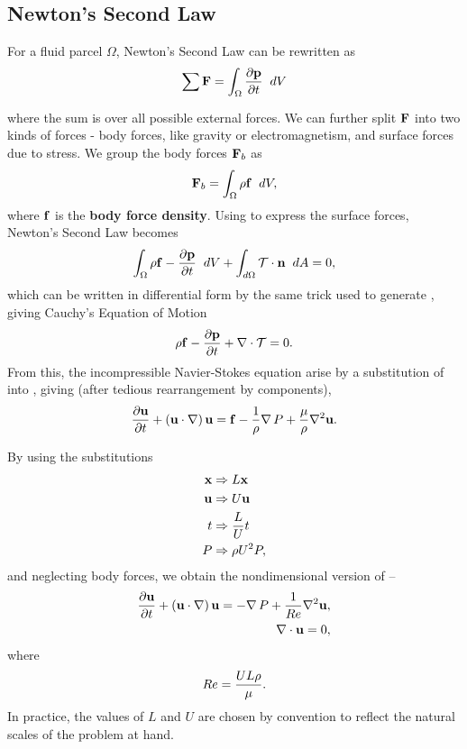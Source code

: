 \subsection{Newton's Second Law}
For a fluid parcel $\Omega$, Newton's Second Law can be rewritten as
\begin{equation}
\sum{}{}{\Vector{F}} = \int{\Omega}{}{
							\pder{1}{\Vector{p}}{t}}{dV}
\end{equation}
where the sum is over all possible external forces. We can further split $\mathbf{F}$ into two kinds of forces - body forces, like gravity or electromagnetism, and surface forces due to stress. We group the body forces $\mathbf{F}_b$ as \begin{equation}
\Vector{F}_b = \int{\Omega}{}{\rho\Vector{f}}{dV},
\end{equation}
where $\mathbf{f}$ is the {\bf body force density}. Using  to express the surface forces, Newton's Second Law becomes
\begin{equation}
\int{\Omega}{}{\rho{\Vector{f}-\pder{1}{\Vector{p}}{t}}}{dV} + \int{d\Omega}{}{\Tensor{T}\cdot\Vector{n}}{dA} = 0,
\end{equation}
which can be written in differential form by the same trick used to generate , giving Cauchy's Equation of Motion
\begin{equation}\label{eq:CauchyEOM}
\rho{\Vector{f}-\pder{1}{\Vector{p}}{t} } + \Div{\Tensor{T}} = 0.
\end{equation}
From this, the incompressible Navier-Stokes equation arise by a substitution of  into , giving (after tedious rearrangement by components),
\begin{equation}\label{eq:NS}
\pder{1}{\Vector{u}}{t} + \paren{\Vector{u}\cdot\nabla}\Vector{u} = \Vector{f} - \frac{1}{\rho}\Grad{P} + \frac{\mu}{\rho}\nabla^2\Vector{u}.
\end{equation}

By using the substitutions
\begin{align}
\mathbf{x} &\Rightarrow L\mathbf{x}\\
\mathbf{u} &\Rightarrow U\mathbf{u}\\
t &\Rightarrow \dfrac{L}{U}t\\
P &\Rightarrow \rho U^2P,
\end{align}
and neglecting body forces, we obtain the nondimensional version of  --
\begin{align}
\pder{1}{\Vector{u}}{t} + \paren{\Vector{u}\cdot\nabla}\Vector{u} = -\Grad{P} + \frac{1}{\ReN}\nabla^2\Vector{u}\label{eq:NSND},\\
\nabla\cdot \Vector{u} = 0,
\end{align}
where \begin{equation}\label{eq:ReN}Re= \dfrac{UL\rho}{\mu}.\end{equation} In practice, the values of $L$ and $U$ are chosen by convention to reflect the natural scales of the problem at hand.
 
